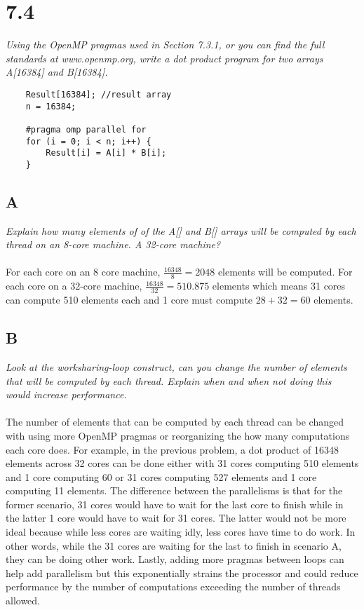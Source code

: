 \documentclass[10pt]{article}
\begin{document}
\section{7.4}
\textit{Using the OpenMP pragmas used in Section 7.3.1, or you can find the full standards at www.openmp.org, write a dot product program for two arrays A[16384] and
B[16384].}

\begin{lstlisting}
    Result[16384]; //result array
    n = 16384;

    #pragma omp parallel for
    for (i = 0; i < n; i++) {
        Result[i] = A[i] * B[i];
    }
\end{lstlisting}



\subsection{A}
\textit{Explain how many elements of of the A[] and B[] arrays will be computed by each
thread on an 8-core machine. A 32-core machine?}
\paragraph{} For each core on an 8 core machine, $\frac{16348}{8} = 2048$ elements will be computed. For each core on a 32-core machine,
$\frac{16348}{32} = 510.875$ elements which means 31 cores can compute 510 elements each and 1 core must compute $28 + 32 = 60$ elements. 
\subsection{B}
\textit{Look at the worksharing-loop construct, can you change the number of elements that
will be computed by each thread. Explain when and when not doing this would increase performance.}
\paragraph{} The number of elements that can be computed by each thread can be changed with using more OpenMP pragmas or reorganizing the 
how many computations each core does. For example, in the previous problem, a dot product of 16348 elements across 32 cores can be done 
either with 31 cores computing 510 elements and 1 core computing 60 or 31 cores computing 527 elements and 1 core computing 11 elements. 
The difference between the parallelisms is that for the former scenario, 31 cores would have to wait for the last core to finish while in the latter
1 core would have to wait for 31 cores. The latter would not be more ideal because while less cores are waiting idly, less cores have time to do work. In other words, 
while the 31 cores are waiting for the last to finish in scenario A, they can be doing other work. Lastly, adding more pragmas between loops can help add parallelism
but this exponentially strains the processor and could reduce performance by the number of computations exceeding the number of threads allowed. 
\end{document}
